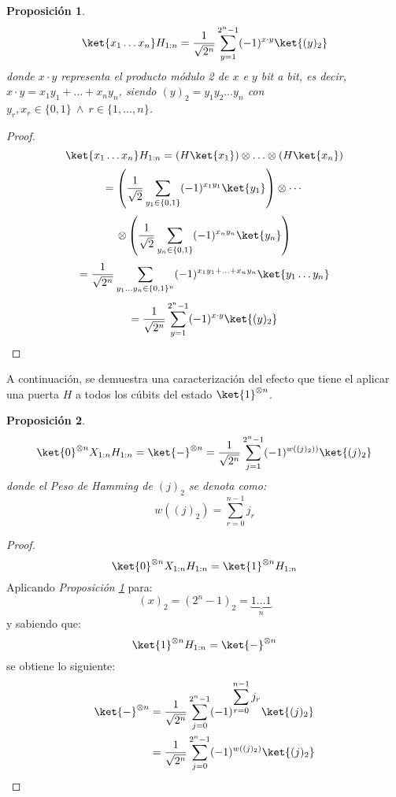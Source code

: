 \documentclass[10pt,conference,a4paper]{IEEEtran}
\newtheorem{prop}{Proposición}[section]
\begin{document}
    \vspace{1.5mm}
    \begin{prop}
        \begin{equation}
            \ket{x_{1}\ldots x_{n}} H_{1:n} = \dfrac{1}{\sqrt{2^n}}\displaystyle\sum_{y=1}^{2^n-1}(-1)^{x\cdot y}\ket{(y)_2}
        \end{equation}
        \label{prop:1}
        donde $x\cdot y$ representa el producto módulo 2 de $x$ e $y$ bit a bit, es decir, $x\cdot y = x_{1}y_{1}+\ldots + x_n y_n$, siendo $(y)_2=y_{1}y_2\ldots y_n$ con $y_r,x_r\in\{0,1\}\ \land \ r\in\{1,\ldots,n\}$.
    \end{prop}
    \begin{proof}
        $$\ket{x_{1}\ldots x_n}H_{1:n} = (H\ket{x_{1}})\otimes\ldots\otimes ( H\ket{x_n})$$
        $$=\left(\dfrac{1}{\sqrt{2}}\displaystyle\sum_{y_{1}\in\{0,1\}}(-1)^{x_{1}y_{1}}\ket{y_{1}}\right )\otimes\cdots$$
        $$\otimes \left(\dfrac{1}{\sqrt{2}}\displaystyle\sum_{y_{n}\in\{0,1\}}(-1)^{x_{n}y_{n}}\ket{y_{n}}\right )$$
        $$=\dfrac{1}{\sqrt{2^n}}\displaystyle\sum_{y_{1}\ldots y_n\in\{0,1\}^n}(-1)^{x_{1}y_{1}+\ldots + x_n y_n}\ket{y_{1}\ldots y_n}$$
        $$=\dfrac{1}{\sqrt{2^n}}\displaystyle\sum_{y=1}^{2^n-1}(-1)^{x\cdot y}\ket{(y)_2}$$
    \end{proof}
    \vspace{1.5mm}
    A continuación, se demuestra una caracterización del efecto que tiene el aplicar una puerta $H$ a todos los cúbits del estado
    $\ket{1}^{\otimes n}$.
    \vspace{1.5mm}
    \begin{prop}
        \begin{equation}
            \ket{0}^{\otimes n}X_{1:n}H_{1:n} = \ket{-}^{\otimes n}= \displaystyle \dfrac{1}{\sqrt{2^n}}\sum_{j=1}^{2^n-1}(-1)^{w((j)_2))}\ket{(j)_2}
        \end{equation}
        \label{prop:2}
        donde el Peso de Hamming de $(j)_2$ se denota como:
        $$w((j)_2)=\displaystyle\sum_{r=0}^{n-1}j_r$$
    \end{prop}
    \begin{proof}
        $$\ket{0}^{\otimes n}X_{1:n}H_{1:n} =\ket{1}^{\otimes n} H_{1:n}$$
        Aplicando \textit{Proposición \ref{prop:1}} para:\\
        $$(x)_2=(2^n-1)_2=\underbrace{1\ldots 1}_n$$ y sabiendo que:\\
        $$\ket{1}^{\otimes n} H_{1:n}=\ket{-}^{\otimes n}$$
        se obtiene lo siguiente:
        \begin{align*}
            \ket{-}^{\otimes n} &= \dfrac{1}{\sqrt{2^n}}\displaystyle\sum_{j=0}^{2^n-1}(-1)^{\displaystyle\sum_{r=0}^{n-1}j_r}\ket{(j)_2}\\
            &=\dfrac{1}{\sqrt{2^n}}\displaystyle\sum_{j=0}^{2^n-1}(-1)^{w((j)_2)}\ket{(j)_2}
        \end{align*}
    \end{proof}
\end{document}
